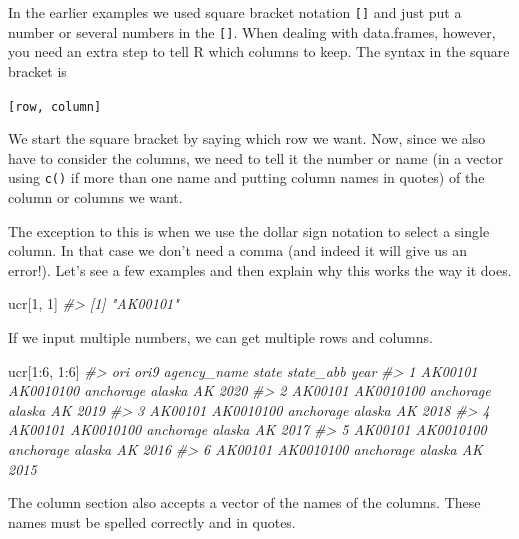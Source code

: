 \documentclass[
]{krantz}
\makeatletter
\newenvironment{Shaded}{\begin{snugshade}}{\end{snugshade}}
\newcommand{\CommentTok}[1]{\textcolor[rgb]{0.37,0.37,0.37}{\textit{#1}}}
\newcommand{\DecValTok}[1]{\textcolor[rgb]{0.06,0.06,0.06}{#1}}
\newcommand{\NormalTok}[1]{#1}
\newcommand{\SpecialCharTok}[1]{\textcolor[rgb]{0,0,0}{#1}}
\newenvironment{kframe}{%
\medskip{}
\setlength{\fboxsep}{.8em}
 \def\at@end@of@kframe{}%
 \ifinner\ifhmode%
  \def\at@end@of@kframe{\end{minipage}}%
  \begin{minipage}{\columnwidth}%
 \fi\fi%
 \def\FrameCommand##1{\hskip\@totalleftmargin \hskip-\fboxsep
 \colorbox{shadecolor}{##1}\hskip-\fboxsep
     \hskip-\linewidth \hskip-\@totalleftmargin \hskip\columnwidth}%
 \MakeFramed {\advance\hsize-\width
   \@totalleftmargin\z@ \linewidth\hsize
   \@setminipage}}%
 {\par\unskip\endMakeFramed%
 \at@end@of@kframe}
\renewenvironment{Shaded}{\begin{kframe}}{\end{kframe}}
\makeatother
\begin{document}
In the earlier examples we used square bracket notation \texttt{{[}{]}} and just put a number or several numbers in the \texttt{{[}{]}}. When dealing with data.frames, however, you need an extra step to tell R which columns to keep. The syntax in the square bracket is

\texttt{{[}row,\ column{]}}

We start the square bracket by saying which row we want. Now, since we also have to consider the columns, we need to tell it the number or name (in a vector using \texttt{c()} if more than one name and putting column names in quotes) of the column or columns we want.

The exception to this is when we use the dollar sign notation to select a single column. In that case we don't need a comma (and indeed it will give us an error!). Let's see a few examples and then explain why this works the way it does.

\begin{Shaded}
\begin{Highlighting}[]
\NormalTok{ucr[}\DecValTok{1}\NormalTok{, }\DecValTok{1}\NormalTok{]}
\CommentTok{\#\textgreater{} [1] "AK00101"}
\end{Highlighting}
\end{Shaded}

If we input multiple numbers, we can get multiple rows and columns.

\begin{Shaded}
\begin{Highlighting}[]
\NormalTok{ucr[}\DecValTok{1}\SpecialCharTok{:}\DecValTok{6}\NormalTok{, }\DecValTok{1}\SpecialCharTok{:}\DecValTok{6}\NormalTok{]}
\CommentTok{\#\textgreater{}       ori      ori9 agency\_name  state state\_abb year}
\CommentTok{\#\textgreater{} 1 AK00101 AK0010100   anchorage alaska        AK 2020}
\CommentTok{\#\textgreater{} 2 AK00101 AK0010100   anchorage alaska        AK 2019}
\CommentTok{\#\textgreater{} 3 AK00101 AK0010100   anchorage alaska        AK 2018}
\CommentTok{\#\textgreater{} 4 AK00101 AK0010100   anchorage alaska        AK 2017}
\CommentTok{\#\textgreater{} 5 AK00101 AK0010100   anchorage alaska        AK 2016}
\CommentTok{\#\textgreater{} 6 AK00101 AK0010100   anchorage alaska        AK 2015}
\end{Highlighting}
\end{Shaded}

The column section also accepts a vector of the names of the columns. These names must be spelled correctly and in quotes.
\end{document}
